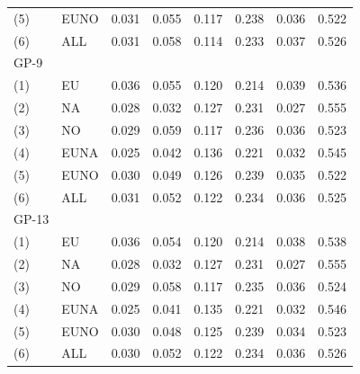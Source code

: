 \begin{table}[H]
\begin{tabular}{llrrrrrr}
		(5)   & EUNO   &   0.031 &   0.055 &   0.117 &   0.238 &   0.036 &   0.522 \\
		(6)   & ALL    &   0.031 &   0.058 &   0.114 &   0.233 &   0.037 &   0.526 \\ \hline
		GP-9  &        &         &         &         &         &         &         \\
		(1)   & EU     &   0.036 &   0.055 &   0.120 &   0.214 &   0.039 &   0.536 \\
		(2)   & NA     &   0.028 &   0.032 &   0.127 &   0.231 &   0.027 &   0.555 \\
		(3)   & NO     &   0.029 &   0.059 &   0.117 &   0.236 &   0.036 &   0.523 \\
		(4)   & EUNA   &   0.025 &   0.042 &   0.136 &   0.221 &   0.032 &   0.545 \\
		(5)   & EUNO   &   0.030 &   0.049 &   0.126 &   0.239 &   0.035 &   0.522 \\
		(6)   & ALL    &   0.031 &   0.052 &   0.122 &   0.234 &   0.036 &   0.525 \\ \hline
		GP-13 &        &         &         &         &         &         &         \\
		(1)   & EU     &   0.036 &   0.054 &   0.120 &   0.214 &   0.038 &   0.538 \\
		(2)   & NA     &   0.028 &   0.032 &   0.127 &   0.231 &   0.027 &   0.555 \\
		(3)   & NO     &   0.029 &   0.058 &   0.117 &   0.235 &   0.036 &   0.524 \\
		(4)   & EUNA   &   0.025 &   0.041 &   0.135 &   0.221 &   0.032 &   0.546 \\
		(5)   & EUNO   &   0.030 &   0.048 &   0.125 &   0.239 &   0.034 &   0.523 \\
		(6)   & ALL    &   0.030 &   0.052 &   0.122 &   0.234 &   0.036 &   0.526 \\ \hline\hline
	\end{tabular}
\end{table}
